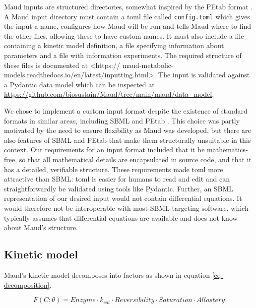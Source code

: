\documentclass[journal=,manuscript=]{achemso}
\begin{document}
Maud inputs are structured directories, somewhat inspired by the PEtab
format \citet{SchmiesterSch2021}. A Maud input directory must contain a
toml \citep{preston-wernertomandgedampradyunTOMLSpecification0rc2020}
file called \texttt{config.toml} which gives the input a name,
configures how Maud will be run and tells Maud where to find the other
files, allowing these to have custom names. It must also include a file
containing a kinetic model definition, a file specifying information
about parameters and a file with information experiments. The required
structure of these files is documented at \textless https://
maud-metabolic-models.readthedocs.io/en/latest/inputting.html\textgreater.
The input is validated against a Pydantic
\citep{pydanticdevelopersPydantic2022} data model which can be inspected
at \url{https://github.com/biosustain/Maud/tree/main/maud/data_model}.

We chose to implement a custom input format despite the existence of
standard formats in similar areas, including SBML
\citep{keatingSBMLLevelExtensible2020} and PEtab
\citep{SchmiesterSch2021}. This choice was partly motivated by the need
to ensure flexibility as Maud was developed, but there are also features
of SBML and PEtab that make them structurally unsuitable in this
context. Our requirements for an input format included that it be
mathematics-free, so that all mathematical details are encapsulated in
source code, and that it has a detailed, verifiable structure. These
requirements made toml more attractive than SBML: toml is easier for
humans to read and edit and can straightforwardly be validated using
tools like Pydantic. Further, an SBML representation of our desired
input would not contain differential equations. It would therefore not
be interoperable with most SBML targeting software, which typically
assumes that differential equations are available and does not know
about Maud's structure.

\hypertarget{kinetic-model}{%
\subsection{Kinetic model}\label{kinetic-model}}

Maud's kinetic model decomposes into factors as shown in equation
\eqref{eq-decomposition}.

\begin{equation}
F(C;\theta) = Enzyme\cdot k_{cat}\cdot Reversibility \cdot Saturation \cdot Allostery \label{eq-decomposition}
\end{equation}
\end{document}
